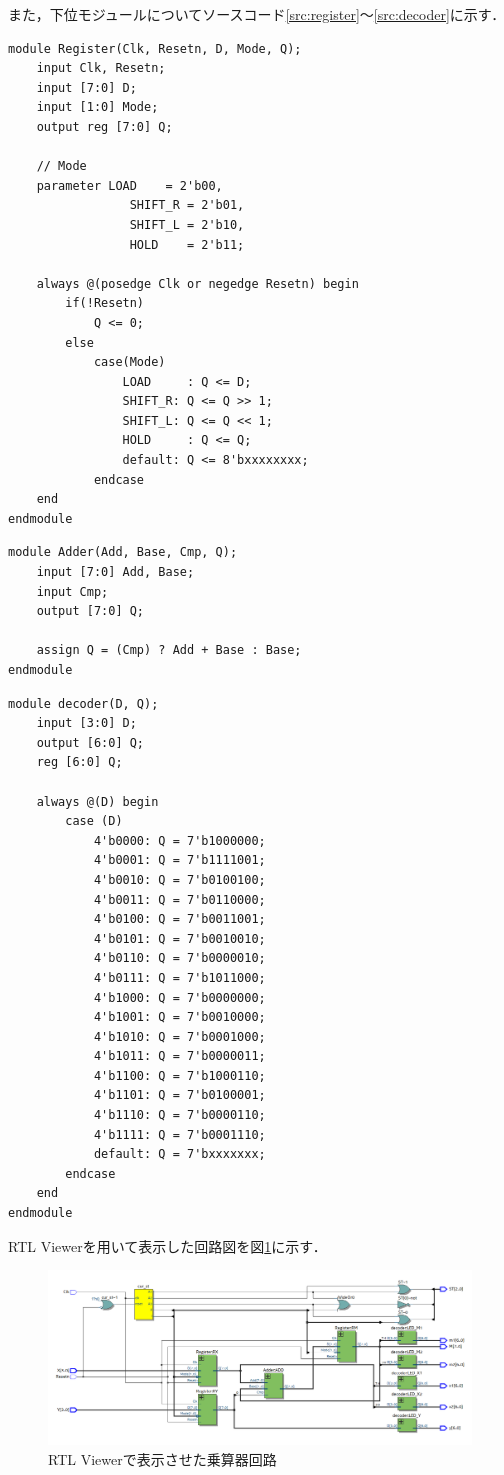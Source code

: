 \documentclass{jlreq}
\numberwithin{equation}{section}
\begin{document}
また，下位モジュールについてソースコード\ref{src:register}～\ref{src:decoder}に示す．
\begin{lstlisting}[caption={モードの情報を含んだレジスタモジュール}, label={src:register}]
module Register(Clk, Resetn, D, Mode, Q);
	input Clk, Resetn;
	input [7:0] D;
	input [1:0] Mode;
	output reg [7:0] Q;
	
	// Mode
	parameter LOAD    = 2'b00,
				 SHIFT_R = 2'b01,
				 SHIFT_L = 2'b10,
				 HOLD    = 2'b11;
	
	always @(posedge Clk or negedge Resetn) begin
		if(!Resetn)
			Q <= 0;
		else
			case(Mode)
				LOAD	 : Q <= D;
				SHIFT_R: Q <= Q >> 1;
				SHIFT_L: Q <= Q << 1;
				HOLD	 : Q <= Q;
				default: Q <= 8'bxxxxxxxx;
			endcase
	end
endmodule
\end{lstlisting}

\begin{lstlisting}[caption={加算器モジュール}, label={src:adder}]
module Adder(Add, Base, Cmp, Q);
	input [7:0] Add, Base;
	input Cmp;
	output [7:0] Q;
	
	assign Q = (Cmp) ? Add + Base : Base;
endmodule
\end{lstlisting}

\begin{lstlisting}[caption={デコーダモジュール}, label={src:decoder}]
module decoder(D, Q);
	input [3:0] D;
	output [6:0] Q;
	reg [6:0] Q;
	
	always @(D) begin
		case (D)
			4'b0000: Q = 7'b1000000;
			4'b0001: Q = 7'b1111001;
			4'b0010: Q = 7'b0100100;
			4'b0011: Q = 7'b0110000;
			4'b0100: Q = 7'b0011001;
			4'b0101: Q = 7'b0010010;
			4'b0110: Q = 7'b0000010;
			4'b0111: Q = 7'b1011000;
			4'b1000: Q = 7'b0000000;
			4'b1001: Q = 7'b0010000;
			4'b1010: Q = 7'b0001000;
			4'b1011: Q = 7'b0000011;
			4'b1100: Q = 7'b1000110;
			4'b1101: Q = 7'b0100001;
			4'b1110: Q = 7'b0000110;
			4'b1111: Q = 7'b0001110;
			default: Q = 7'bxxxxxxx;
		endcase
	end
endmodule

\end{lstlisting}

RTL Viewerを用いて表示した回路図を図\ref{fig:multi_rtl}に示す．
\begin{figure}[H]
  \centering
  \includegraphics[width=\textwidth]{assets/multi_rtl.png}
  \caption{RTL Viewerで表示させた乗算器回路}
  \label{fig:multi_rtl}
\end{figure}
\end{document}
